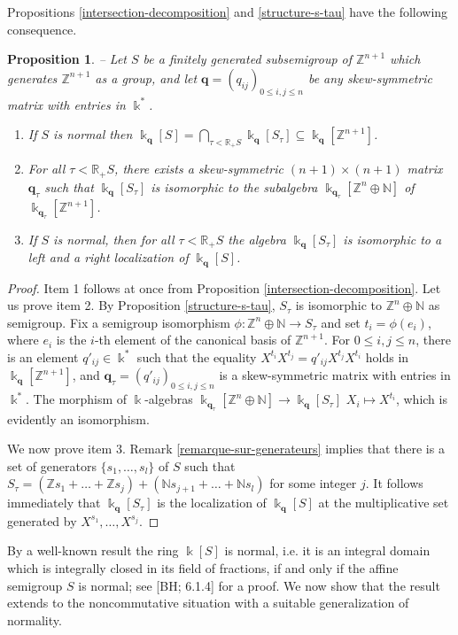 \documentclass[twoside,11pt]{article}
\renewcommand{\k}{\Bbbk}
\newcommand{\N}{{\mathbb N}}
\newcommand{\Z}{{\mathbb Z}}
\newcommand{\RR}{{\mathbb R}}
\newcommand{\q}{{\mathbf q}}
\newtheorem{subproposition}[subtheorem]{Proposition}
\begin{document}
Propositions \ref{intersection-decomposition} and \ref{structure-s-tau} have the following
consequence.

\begin{subproposition} -- \label{decomposition}
Let $S$ be a finitely generated subsemigroup of $\Z^{n+1}$ which generates $\Z^{n+1}$ as a
group, and let $\q=(q_{ij})_{0 \le i,j \le n}$ be any skew-symmetric matrix with entries
in $\k^*$. 
\begin{enumerate}
	\item If  $S$ is normal then $\displaystyle \k_\q[S] = \bigcap_{\tau<\RR_+ S}
		\k_\q[S_\tau] \subseteq \k_\q[\Z^{n+1}]$.
	\item For all $\tau<\RR_+S$, there exists a skew-symmetric $(n+1) \times (n+1)$
		matrix $\q_\tau$ such that $\k_\q[S_\tau]$ is isomorphic to the subalgebra
		$\k_{\q_\tau}[\Z^n \oplus \N]$ of $\k_{\q_\tau}[\Z^{n+1}]$.
	\item If $S$ is normal, then for all $\tau<\RR_+S$ the algebra $\k_\q[S_\tau]$ is
		isomorphic to a left and a right localization of $\k_\q[S]$.
\end{enumerate}
\end{subproposition}
\begin{proof} Item 1 follows at once from Proposition \ref{intersection-decomposition}.
Let us prove item 2. By Proposition \ref{structure-s-tau}, $S_\tau$ is isomorphic to $\Z^n
\oplus \N$ as semigroup. Fix a semigroup isomorphism $\phi : \Z^n \oplus \N
\longrightarrow S_\tau$ and set $t_i=\phi(e_i)$, where $e_i$ is the $i$-th element of the
canonical basis of $\Z^{n+1}$. For $0 \le i,j \le n$, there is an element $q'_{ij}\in\k^*$
such that the equality $X^{t_i}X^{t_j}=q'_{ij}X^{t_j}X^{t_i}$ holds in $\k_\q[\Z^{n+1}]$,
and $\q_\tau=(q'_{ij})_{0 \le i,j \le n}$ is a skew-symmetric matrix with entries in
$\k^*$. The morphism of $\k$-algebras $\k_{\q_\tau}[\Z^n\oplus\N] \longrightarrow
\k_\q[S_\tau]$  $X_i \mapsto X^{t_i}$, which is evidently an isomorphism.

We now prove item 3. Remark \ref{remarque-sur-generateurs} implies that there is a set of
generators  $\{s_1,\dots,s_l\}$ of $S$ such that $S_\tau = (\Z s_1 + \dots + \Z s_j) + (\N
s_{j+1} + \dots + \N s_l)$ for some integer $j$. It follows immediately that
$\k_\q[S_\tau]$ is the localization of $\k_\q[S]$ at the multiplicative set generated by
$X^{s_1}, \ldots, X^{s_j}$. \end{proof}

By a well-known result the ring $\k[S]$ is normal, i.e. it is an integral domain which is
integrally closed in its field of fractions, if and only if the affine semigroup $S$ is
normal; see [BH; 6.1.4] for a proof. We now show that the result extends to the
noncommutative situation with a suitable generalization of normality. 
\end{document}

